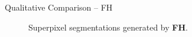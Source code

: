 \documentclass[handout]{beamer}
\begin{document}
	\begin{frame}{Qualitative Comparison -- FH}
		\begin{figure}
   			\centering
   			\caption{Superpixel segmentations generated by \textbf{FH}.}
   		\end{figure}
	\end{frame}
	
\end{document}
